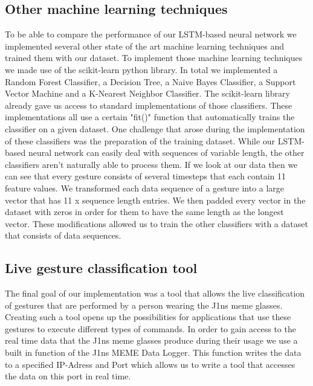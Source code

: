 \documentclass[runningheads]{llncs}
\begin{document}
\subsection{Other machine learning techniques}

To be able to compare the performance of our LSTM-based neural network we implemented several other state of the art machine learning techniques and trained them with our dataset. To implement those machine learning techniques we made use of the scikit-learn python library. In total we implemented a Random Forest Classifier, a Decision Tree, a Naive Bayes Classifier, a Support Vector Machine and a K-Nearest Neighbor Classifier. The scikit-learn library already gave us access to standard implementations of those classifiers. These implementations all use a certain "fit()" function that automatically trains the classifier on a given dataset. One challenge that arose during the implementation of these classifiers was the preparation of the training dataset. While our LSTM-based neural network can easily deal with sequences of variable length, the other classifiers aren't naturally able to process them. If we look at our data then we can see that every gesture consists of several timesteps that each contain 11 feature values. We transformed each data sequence of a gesture into a large vector that has 11 x sequence length entries. We then padded every vector in the dataset with zeros in order for them to have the same length as the longest vector. These modifications allowed us to train the other classifiers with a dataset that consists of data sequences.

\subsection{Live gesture classification tool}

The final goal of our implementation was a tool that allows the live classification of gestures that are performed by a person wearing the J1ns meme glasses. Creating such a tool opens up the possibilities for applications that use these gestures to execute different types of commands. In order to gain access to the real time data that the J1ns meme glasses produce during their usage we use a built in function of the J1ns MEME Data Logger. This function writes the data to a specified IP-Adress and Port which allows us to write a tool that accesses the data on this port in real time.
\end{document}
